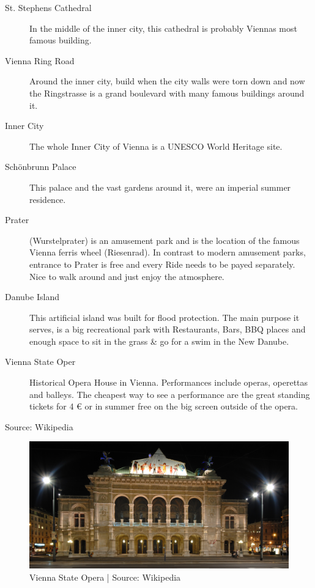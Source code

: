\documentclass[10pt,a4paper]{article}
\begin{document}
\begin{description}
\item[\color{kdedarker} St. Stephens Cathedral] In the middle of the inner city, this cathedral is probably Viennas most famous building.
\item[\color{kdedarker} Vienna Ring Road] Around the inner city, build when the city walls were torn down and now the Ringstrasse is a grand boulevard with many famous buildings around it.
\item[\color{kdedarker} Inner City] The whole Inner City of Vienna is a UNESCO World Heritage site.
\item[\color{kdedarker} Schönbrunn Palace] This palace and the vast gardens around it, were an imperial summer residence.
\item[\color{kdedarker} Prater] (Wurstelprater) is an amusement park and is the location of the famous Vienna ferris wheel (Riesenrad). In contrast to modern amusement parks, entrance to Prater is free and every Ride needs to be payed separately. Nice to walk around and just enjoy the atmosphere.
\item[\color{kdedarker} Danube Island] This artificial island was built for flood protection. The main purpose it serves, is a big recreational park with Restaurants, Bars, BBQ places and enough space to sit in the grass \& go for a swim in the New Danube.
\item[\color{kdedarker} Vienna State Oper] Historical Opera House in Vienna. Performances include operas, operettas and balleys. The cheapest way to see a performance are the great standing tickets for 4 \euro{} or in summer free on the big screen outside of the opera.
\end{description}

{\footnotesize{Source: Wikipedia}}\\


\begin{figure}[ht]
\begin{center}
\includegraphics[width=\textwidth]{opera_vienna.jpg}
\footnotesize{Vienna State Opera | Source: Wikipedia}
\end{center}
\end{figure}
\end{document}
